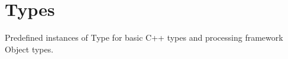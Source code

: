 \hypertarget{group___process_types}{}\section{Types}
\label{group___process_types}
Predefined instances of Type for basic C++ types and processing framework Object types. 

